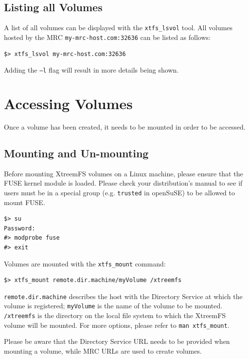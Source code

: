 \documentclass[a4paper,10pt]{book}
\begin{document}
\subsection{Listing all Volumes}

A list of all volumes can be displayed with the \texttt{xtfs\_lsvol} tool. All volumes hosted by the MRC \texttt{my-mrc-host.com:32636} can be listed as follows:

\begin{verbatim}
$> xtfs_lsvol my-mrc-host.com:32636
\end{verbatim}

Adding the \texttt{--l} flag will result in more details being shown.


\section{Accessing Volumes}
\label{sec:mount_vol}

Once a volume has been created, it needs to be mounted in order to be accessed.

\subsection{Mounting and Un-mounting}

Before mounting XtreemFS volumes on a Linux machine, please ensure that the FUSE kernel module is loaded. Please check your distribution's manual to see if users must be in a special group (e.g. \texttt{trusted} in openSuSE) to be allowed to mount FUSE.


\begin{verbatim}
$> su
Password:
#> modprobe fuse
#> exit
\end{verbatim}


Volumes are mounted with the \texttt{xtfs\_mount} command:


\begin{verbatim}
$> xtfs_mount remote.dir.machine/myVolume /xtreemfs
\end{verbatim}


\texttt{remote.dir.machine} describes the host with the Directory Service at which the volume is registered; \texttt{myVolume} is the name of the volume to be mounted. \texttt{/xtreemfs} is the directory on the local file system to which the XtreemFS volume will be mounted. For more options, please refer to \texttt{man xtfs\_mount}.

Please be aware that the Directory Service URL needs to be provided when mounting a volume, while MRC URLs are used to create volumes.
\end{document}
